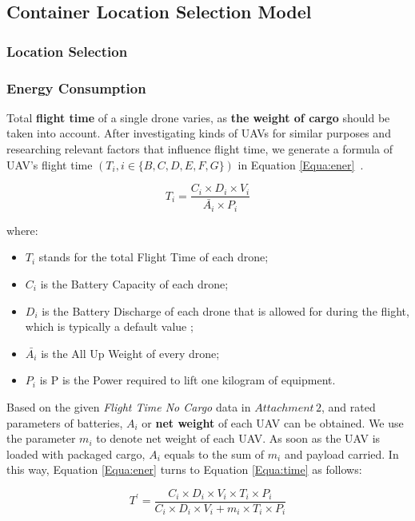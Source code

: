\documentclass{mcmthesis}
\begin{document}
\subsection{Container Location Selection Model}


\subsubsection{Location Selection}


\subsubsection{Energy Consumption}

Total \textbf{flight time} of a single drone varies, as \textbf{the weight of cargo} should be taken into account. After investigating kinds of UAVs for similar purposes and researching relevant factors that influence flight time, we generate a formula of UAV's flight time $(T_i,i\in\{B,C,D,E,F,G\})$ in Equation \eqref{Equa:ener}~\cite{DroneFlightTime}.

\begin{equation}\label{Equa:ener}
    T_i = \frac{C_i \times D_i \times V_i}{\bar{A_i} \times P_i}
\end{equation}

where:
\begin{itemize}
\item $T_i$ stands for the total Flight Time of each drone;
\item $C_i$ is the Battery Capacity of each drone;
\item $D_i$ is the Battery Discharge of each drone that is allowed for during the flight, which is typically a default value ;
\item $\bar{A_i}$ is the All Up Weight of every drone;
\item $P_i$ is P is the Power required to lift one kilogram of equipment.
\end{itemize}

Based on the given \emph{Flight Time No Cargo} data in $Attachment\,2$, and rated parameters of batteries, $A_i$ or \textbf{net weight} of each UAV can be obtained. We use the parameter $m_i$ to denote net weight of each UAV. As soon as the UAV is loaded with packaged cargo, $A_i$ equals to the sum of $m_i$ and payload carried. In this way, Equation \ref{Equa:ener} turns to Equation \ref{Equa:time} as follows:

\begin{equation}\label{Equa:time}
    T^{'} = \frac{C_i \times D_i \times V_i \times T_i \times P_i}{C_i \times D_i \times V_i + m_i \times T_i \times P_i}
\end{equation}
\end{document}
